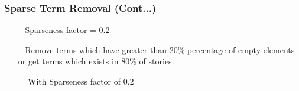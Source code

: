 \documentclass{beamer}
\begin{document}
\begin{frame}[noframenumbering]
\frametitle{Sparse Term Removal (Cont...)}
\begin{itemize}
\item[--] Sparseness factor = 0.2
\item[--] Remove terms which have greater than 20\% percentage of empty elements or get terms which exists in 80\% of stories.
\end{itemize}
\begin{figure}[h] 
\centering
{}
\centering
\caption{With Sparseness factor of 0.2}
\label{DTM}
\end{figure}
\end{frame}
\end{document}
